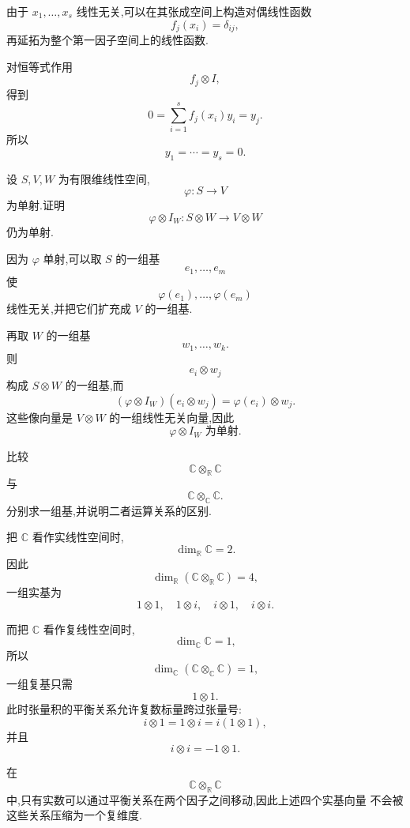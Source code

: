 \begin{solution}
由于 $x_1,\ldots,x_s$ 线性无关,可以在其张成空间上构造对偶线性函数
\[
f_j(x_i)=\delta_{ij},
\]
再延拓为整个第一因子空间上的线性函数.

对恒等式作用
\[
f_j\otimes I,
\]
得到
\[
0
=
\sum\limits_{i=1}^{s}
f_j(x_i)y_i
=
y_j.
\]
所以
\[
\boxed{y_1=\cdots=y_s=0}.
\]
\end{solution}


\begin{example}[\markstar]
设 $S,V,W$ 为有限维线性空间,
\[
\varphi:S\to V
\]
为单射.证明
\[
\varphi\otimes I_W:
S\otimes W\to V\otimes W
\]
仍为单射.
\end{example}
\exampleblank

\begin{solution}
因为 $\varphi$ 单射,可以取 $S$ 的一组基
\[
e_1,\ldots,e_m
\]
使
\[
\varphi(e_1),\ldots,\varphi(e_m)
\]
线性无关,并把它们扩充成 $V$ 的一组基.

再取 $W$ 的一组基
\[
w_1,\ldots,w_k.
\]
则
\[
e_i\otimes w_j
\]
构成 $S\otimes W$ 的一组基,而
\[
(\varphi\otimes I_W)(e_i\otimes w_j)
=
\varphi(e_i)\otimes w_j.
\]
这些像向量是 $V\otimes W$ 的一组线性无关向量,因此
\[
\boxed{\varphi\otimes I_W\text{ 为单射}.}
\]
\end{solution}


\begin{example}
比较
\[
\mathbb{C}\otimes_{\mathbb{R}}\mathbb{C}
\]
与
\[
\mathbb{C}\otimes_{\mathbb{C}}\mathbb{C}.
\]
分别求一组基,并说明二者运算关系的区别.
\end{example}
\exampleblank

\begin{solution}
把 $\mathbb{C}$ 看作实线性空间时,
\[
\dim_{\mathbb{R}}\mathbb{C}=2.
\]
因此
\[
\dim_{\mathbb{R}}
(\mathbb{C}\otimes_{\mathbb{R}}\mathbb{C})=4,
\]
一组实基为
\[
\boxed{
1\otimes1,\quad
1\otimes i,\quad
i\otimes1,\quad
i\otimes i.
}
\]

而把 $\mathbb{C}$ 看作复线性空间时,
\[
\dim_{\mathbb{C}}\mathbb{C}=1,
\]
所以
\[
\dim_{\mathbb{C}}
(\mathbb{C}\otimes_{\mathbb{C}}\mathbb{C})=1,
\]
一组复基只需
\[
\boxed{1\otimes1}.
\]
此时张量积的平衡关系允许复数标量跨过张量号:
\[
i\otimes1
=
1\otimes i
=
i(1\otimes1),
\]
并且
\[
i\otimes i
=
-1\otimes1.
\]

在
\[
\mathbb{C}\otimes_{\mathbb{R}}\mathbb{C}
\]
中,只有实数可以通过平衡关系在两个因子之间移动,因此上述四个实基向量
不会被这些关系压缩为一个复维度.
\end{solution}


